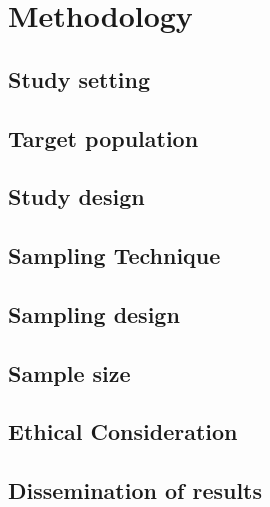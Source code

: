\section{Methodology}

\subsection{Study setting}
\subsection{Target population}
\subsection{Study design}
\subsection{Sampling Technique}
\subsection{Sampling design}
\subsection{Sample size}
\subsection{Ethical Consideration}
\subsection{Dissemination of results}

